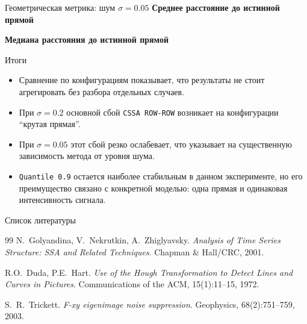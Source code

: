 \documentclass[unicode,notheorems]{beamer}
\begin{document}
\begin{frame}{Геометрическая метрика: шум $\sigma=0.05$}
	\scriptsize
	\centering
	\textbf{Среднее расстояние до истинной прямой}
	\par\vspace{0.06cm}
	{
	\renewcommand{\arraystretch}{0.9}
	\setlength{\tabcolsep}{2pt}
	\resizebox{\textwidth}{!}{}
	}

	\vspace{0.22cm}
	\textbf{Медиана расстояния до истинной прямой}
	\par\vspace{0.06cm}
	{
	\renewcommand{\arraystretch}{0.9}
	\setlength{\tabcolsep}{2pt}
	\resizebox{\textwidth}{!}{}
	}
\end{frame}

\begin{frame}{Итоги}
	\begin{itemize}
		\item Сравнение по конфигурациям показывает, что результаты не стоит агрегировать без разбора отдельных случаев.
		\item При $\sigma=0.2$ основной сбой \texttt{CSSA ROW-ROW} возникает на конфигурации ``крутая прямая''.
		\item При $\sigma=0.05$ этот сбой резко ослабевает, что указывает на существенную зависимость метода от уровня шума.
		\item \texttt{Quantile 0.9} остается наиболее стабильным в данном эксперименте, но его преимущество связано с конкретной моделью: одна прямая и одинаковая интенсивность сигнала.
	\end{itemize}
\end{frame}

\begin{frame}{Список литературы}
	\begin{thebibliography}{99}
		 N.~Golyandina, V.~Nekrutkin, A.~Zhiglyavsky.
		\textit{Analysis of Time Series Structure: SSA and Related Techniques}.
		Chapman \& Hall/CRC, 2001.

		 R.O.~Duda, P.E.~Hart.
		\textit{Use of the Hough Transformation to Detect Lines and Curves in Pictures}.
		Communications of the ACM, 15(1):11--15, 1972.

		 S.~R.~Trickett.
		\textit{F-xy eigenimage noise suppression}.
		Geophysics, 68(2):751--759, 2003.
	\end{thebibliography}
\end{frame}
\end{document}
